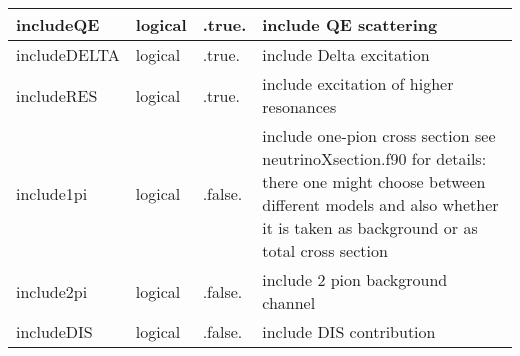 \documentclass{article}
\begin{document}
\begin{longtable}{llll}
\midrule
includeQE & \begin{minipage}[t]{2cm}logical\end{minipage} & \begin{minipage}[t]{2cm}.true.\end{minipage} & \begin{minipage}[t]{12cm}include QE scattering\end{minipage}\\*
\midrule
includeDELTA & \begin{minipage}[t]{2cm}logical\end{minipage} & \begin{minipage}[t]{2cm}.true.\end{minipage} & \begin{minipage}[t]{12cm}include Delta excitation\end{minipage}\\*
\midrule
includeRES & \begin{minipage}[t]{2cm}logical\end{minipage} & \begin{minipage}[t]{2cm}.true.\end{minipage} & \begin{minipage}[t]{12cm}include excitation of higher resonances\end{minipage}\\*
\midrule
include1pi & \begin{minipage}[t]{2cm}logical\end{minipage} & \begin{minipage}[t]{2cm}.false.\end{minipage} & \begin{minipage}[t]{12cm}include one-pion cross section see neutrinoXsection.f90 for details: there one might choose between different models and also whether it is taken as background or as total cross section\end{minipage}\\*
\midrule
include2pi & \begin{minipage}[t]{2cm}logical\end{minipage} & \begin{minipage}[t]{2cm}.false.\end{minipage} & \begin{minipage}[t]{12cm}include 2 pion background channel\end{minipage}\\*
\midrule
includeDIS & \begin{minipage}[t]{2cm}logical\end{minipage} & \begin{minipage}[t]{2cm}.false.\end{minipage} & \begin{minipage}[t]{12cm}include DIS contribution\end{minipage}\\*

\end{longtable}
\end{document}

